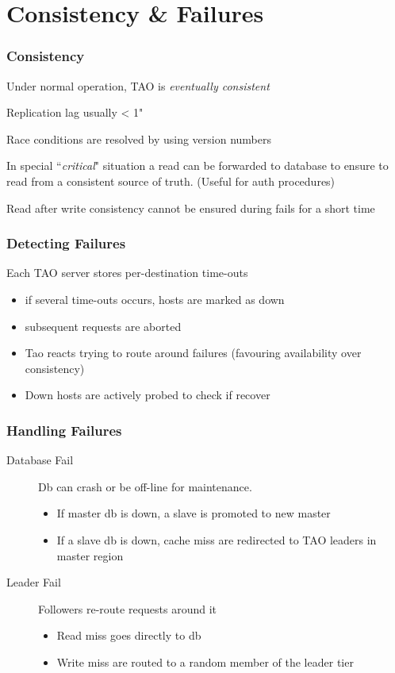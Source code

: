 \section{Consistency \& Failures}
\begin{frame}[t]\frametitle{Consistency}
	Under normal operation, TAO is \emph{eventually consistent}

	Replication lag usually < 1"

	Race conditions are resolved by using version numbers

	In special ``\emph{critical}" situation a read can be forwarded to database to ensure to read from a consistent source of truth. (Useful for auth procedures)


	Read after write consistency cannot be ensured during fails for a short time
\end{frame}

\begin{frame}[t]\frametitle{Detecting Failures}
    Each TAO server stores per-destination time-outs
    \begin{itemize}
    	\item if several time-outs occurs, hosts are marked as down
    	\item subsequent requests are aborted
    	\item Tao reacts trying to route around failures (favouring availability over consistency)
    	\item Down hosts are actively probed to check if recover
    \end{itemize}
\end{frame}

\begin{frame}[c]\frametitle{Handling Failures}
    \begin{description}
    	\item[Database Fail] Db can crash or be off-line for maintenance. 
    	\begin{itemize}
    		\item If master db is down, a slave is promoted to new master
    		\item If a slave db is down, cache miss are redirected to TAO leaders in master region
    	\end{itemize}
    	\item[Leader Fail] Followers re-route requests around it
    	\begin{itemize}
    		\item Read miss goes directly to db
    		\item Write miss are routed to a random member of the leader tier
    	\end{itemize}
    \end{description}
\end{frame}

